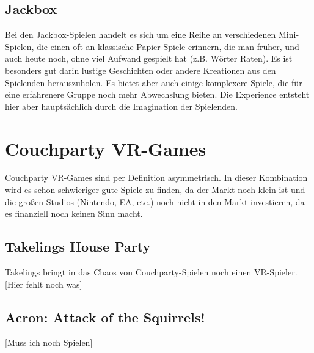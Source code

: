 \subsection{Jackbox}
Bei den Jackbox-Spielen handelt es sich um eine Reihe an verschiedenen Mini-Spielen, die einen oft an klassische Papier-Spiele erinnern, die man früher, und auch heute noch, ohne viel Aufwand gespielt hat (z.B. Wörter Raten). Es ist besonders gut darin lustige Geschichten oder andere Kreationen aus den Spielenden herauszuholen. Es bietet aber auch einige komplexere Spiele, die für eine erfahrenere Gruppe noch mehr Abwechslung bieten. Die Experience entsteht hier aber hauptsächlich durch die Imagination der Spielenden.

\section{Couchparty VR-Games}

Couchparty VR-Games sind per Definition asymmetrisch. In dieser Kombination wird es schon schwieriger gute Spiele zu finden, da der Markt noch klein ist und  die großen Studios (Nintendo, EA, etc.) noch nicht in den Markt investieren, da es finanziell noch keinen Sinn macht.

\subsection{Takelings House Party}

Takelings bringt in das Chaos von Couchparty-Spielen noch einen VR-Spieler. [Hier fehlt noch was]

\subsection{Acron: Attack of the Squirrels!}
[Muss ich noch Spielen]